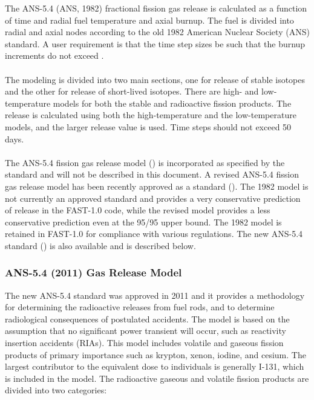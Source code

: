 The ANS-5.4 (ANS, 1982) fractional fission gas release is calculated as a function of time and
radial fuel temperature and axial burnup. The fuel is divided into radial and axial nodes according
to the old 1982 American Nuclear Society (ANS) standard. A user requirement is that the time step
sizes be such that the burnup increments do not exceed .
\\
\\
The modeling is divided into two main sections, one for release of stable isotopes and the other for
release of short-lived isotopes. There are high- and low-temperature models for both the stable and
radioactive fission products. The release is calculated using both the high-temperature and the
low-temperature models, and the larger release value is used. Time steps should not exceed 50 days.
\\
\\
The ANS-5.4 fission gas release model (\cite{ref:ANS1982}) is incorporated as specified by the
standard and will not be described in this document. A revised ANS-5.4 fission gas release model has
been recently approved as a standard (\cite{ref:ANS2011}). The 1982 model is not currently an
approved standard and provides a very conservative prediction of release in the FAST-1.0 code, while
the revised model provides a less conservative prediction even at the 95/95 upper bound. The 1982
model is retained in FAST-1.0 for compliance with various regulations. The new ANS-5.4 standard
(\cite{ref:ANS2011}) is also available and is described below.

\subsubsection{ANS-5.4 (2011) Gas Release Model} \label{section:ans-5.4-2011-gas-release-model}

The new ANS-5.4 standard was approved in 2011 and it provides a methodology for determining the
radioactive releases from fuel rods, and to determine radiological consequences of postulated
accidents. The model is based on the assumption that no significant power transient will occur, such
as reactivity insertion accidents (RIAs). This model includes volatile and gaseous fission products
of primary importance such as krypton, xenon, iodine, and cesium. The largest contributor to the
equivalent dose to individuals is generally I-131, which is included in the model. The radioactive
gaseous and volatile fission products are divided into two categories: 

